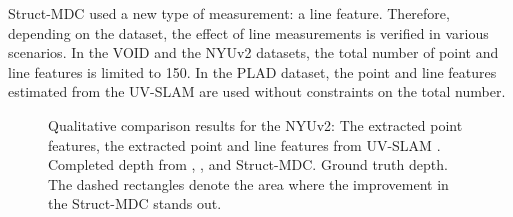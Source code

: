 Struct-MDC \textcolor{color1}{used a new type of measurement: a line feature}. Therefore, depending on the dataset, the effect of line measurements is verified in various \textcolor{color1}{scenarios}.
In \textcolor{color1}{the} VOID and the NYUv2 \textcolor{color1}{datasets}, the total number of point and line features is limited to 150. 
In the PLAD \textcolor{color1}{dataset}, the point and line features estimated from the UV-SLAM are used without constraint\textcolor{color1}{s} on the total number. 


\begin{figure}[!t]
    \centering
    \caption{
        Qualitative comparison results for the NYUv2:  The extracted point features,
         the extracted point and line features from UV-SLAM \cite{uvslsam}.
        Completed depth from 
         \cite{void}, 
         \cite{baseline}, and
         Struct-MDC.
         Ground truth depth. 
        The dashed rectangles denote the area where the improvement in the Struct-MDC stands out.
    }\label{fig:nyu_result}
    \vspace{-0.3cm}
\end{figure}

